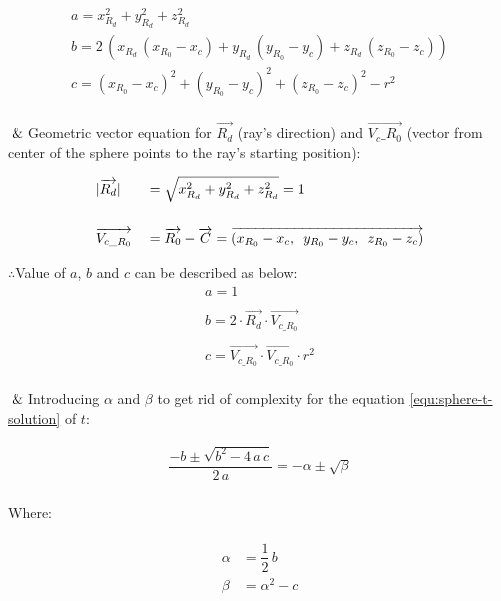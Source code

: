 \[
\begin{array}{lr}
a = x_{R_d}^2 + y_{R_d}^2 + z_{R_d}^2\\
b = 2\,(x_{R_d}\,(x_{R_0} - x_c) + y_{R_d}\,(y_{R_0} - y_c) + z_{R_d}\,(z_{R_0} - z_c))\\
c = (x_{R_0} - x_c)^2 + (y_{R_0} - y_c)^2 + (z_{R_0} - z_c)^2 - r^2\\
\end{array}
\]

$\And$\;\;\;\;Geometric vector equation for $\overrightarrow{R_d}$ (ray's direction) and $\overrightarrow{V_c\_R_0}$ (vector from center of the sphere points to the ray's starting position):

\[
\begin{array}{lr}
\begin{aligned}
&\lvert \overrightarrow{R_d} \rvert &&= \sqrt{x_{R_d}^2 + y_{R_d}^2 + z_{R_d}^2} = 1\\\\
&\overrightarrow{V_{c\_R_0}} &&= \overrightarrow{R_0} - \overrightarrow{C} = \overrightarrow{(x_{R_0} - x_c,\enspace y_{R_0} - y_c,\enspace z_{R_0} - z_c)}\\
\end{aligned}
\end{array}
\]

$\therefore$\;\;\;\;Value of $a$, $b$ and $c$ can be described as below:
\[
\begin{array}{lr}
a =1\\\\
b = 2 \cdot \overrightarrow{R_d} \cdot \overrightarrow{V_{c\_R_0}}\\\\
c = \overrightarrow{V_{c\_R_0}} \cdot \overrightarrow{V_{c\_R_0}} \cdot r^2\\
\end{array}
\]

$\And$\;\;\;\;Introducing $\alpha$ and $\beta$ to get rid of complexity for the equation \ref{equ:sphere-t-solution} of $t$:

\[
\begin{array}{lr}
\dfrac{-b \pm \sqrt{b^2 - 4\,a\,c}}{2\,a} = -\alpha \pm \sqrt{\beta}\\
\end{array}
\]

Where:

\[
\begin{array}{lr}
\begin{aligned}
\alpha &= \dfrac{1}{2}\,b\\
\beta &= \alpha^2 - c\\
\end{aligned}
\end{array}
\]

